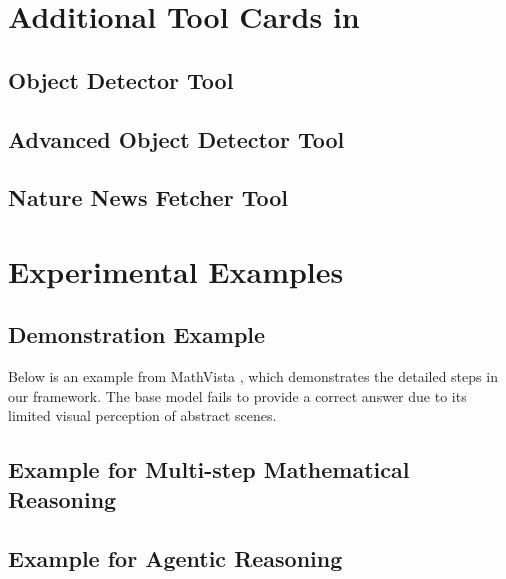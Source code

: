 \section{Additional Tool Cards in \model}
\label{app:additional_toolcards}

\subsection{Object Detector Tool}
\label{app:object_detector_tool}


\subsection{Advanced Object Detector Tool}
\label{app:advanced_object_detector_tool}


\subsection{Nature News Fetcher Tool}
\label{app:nature_news_fetcher_tool}



\clearpage
\section{Experimental Examples}
\label{app:exp_examples}

\subsection{Demonstration Example}
\label{app:demo_example}

Below is an example from MathVista \cite{lu2024mathvista}, which demonstrates the detailed steps in our \model framework. The base \gpt model fails to provide a correct answer due to its limited visual perception of abstract scenes.




\clearpage
\subsection{Example for Multi-step Mathematical Reasoning}



\clearpage
\subsection{Example for Agentic Reasoning}


